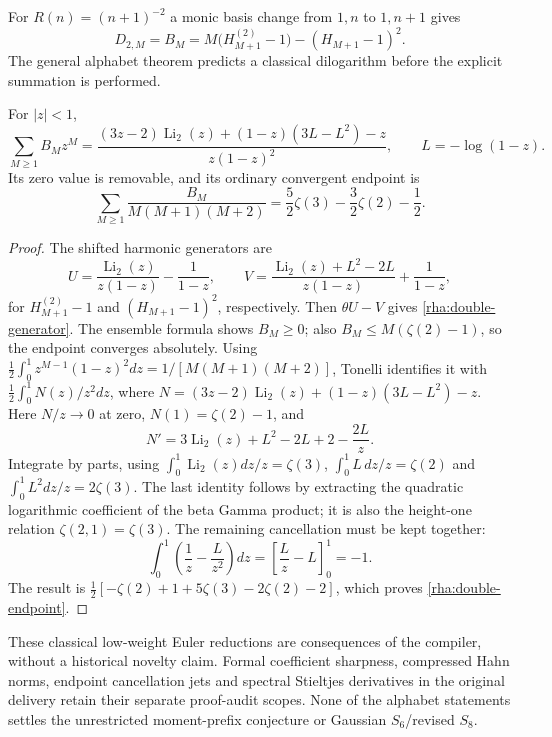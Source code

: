 For $R(n)=(n+1)^{-2}$ a monic basis change from $1,n$ to $1,n+1$
gives
\[
 D_{2,M}=B_M=M\bigl(H_{M+1}^{(2)}-1\bigr)-(H_{M+1}-1)^2.
\]
The general alphabet theorem predicts a classical dilogarithm before
the explicit summation is performed.
\begin{proposition}\label{rha:double}
For $|z|<1$,
\begin{equation}\label{rha:double-generator}
 \sum_{M\ge1}B_Mz^M=
 \frac{(3z-2)\operatorname{Li}_2(z)+(1-z)(3L-L^2)-z}
      {z(1-z)^2},\qquad L=-\log(1-z).
\end{equation}
Its zero value is removable, and its ordinary convergent endpoint is
\begin{equation}\label{rha:double-endpoint}
 \sum_{M\ge1}\frac{B_M}{M(M+1)(M+2)}
       =\frac52\zeta(3)-\frac32\zeta(2)-\frac12.
\end{equation}
\end{proposition}
\begin{proof}
The shifted harmonic generators are
\[
 U=\frac{\operatorname{Li}_2(z)}{z(1-z)}-\frac1{1-z},\qquad
 V=\frac{\operatorname{Li}_2(z)+L^2-2L}{z(1-z)}+\frac1{1-z},
\]
for $H_{M+1}^{(2)}-1$ and $(H_{M+1}-1)^2$, respectively.
Then $\theta U-V$ gives \eqref{rha:double-generator}.
The ensemble formula shows $B_M\ge0$; also
$B_M\le M(\zeta(2)-1)$, so the endpoint converges absolutely.
Using $\frac12\int_0^1 z^{M-1}(1-z)^2dz=1/[M(M+1)(M+2)]$,
Tonelli identifies it with $\frac12\int_0^1 N(z)/z^2dz$, where
$N=(3z-2)\operatorname{Li}_2(z)+(1-z)(3L-L^2)-z$.
Here $N/z\to0$ at zero, $N(1)=\zeta(2)-1$, and
\[
 N'=3\operatorname{Li}_2(z)+L^2-2L+2-\frac{2L}{z}.
\]
Integrate by parts, using $\int_0^1\operatorname{Li}_2(z)dz/z=\zeta(3)$,
$\int_0^1L\,dz/z=\zeta(2)$ and $\int_0^1L^2dz/z=2\zeta(3)$.
The last identity follows by extracting the quadratic logarithmic
coefficient of the beta Gamma product; it is also the height-one
relation $\zeta(2,1)=\zeta(3)$. The remaining cancellation must be
kept together:
\[
 \int_0^1\left(\frac1z-\frac L{z^2}\right)dz
       =\left[\frac Lz-L\right]_0^1=-1.
\]
The result is $\frac12[-\zeta(2)+1+5\zeta(3)-2\zeta(2)-2]$,
which proves \eqref{rha:double-endpoint}.
\end{proof}

These classical low-weight Euler reductions are consequences of the
compiler, without a historical novelty claim. Formal coefficient
sharpness, compressed Hahn norms, endpoint cancellation jets and
spectral Stieltjes derivatives in the original delivery retain their
separate proof-audit scopes. None of the alphabet statements settles
the unrestricted moment-prefix conjecture or Gaussian $S_6$/revised $S_8$.

